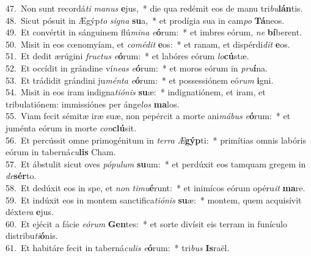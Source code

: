 {47.~}Non sunt recordá\textit{ti} \textit{ma}\textit{nus} \textbf{e}jus,~* die qua redémit eos de manu tri\textit{bu}\textbf{lán}tis.\\
{48.~}Sicut pósuit in Ægýp\textit{to} \textit{si}\textit{gna} \textbf{su}a,~* et prodígia sua in cam\textit{po} \textbf{Tá}neos.\\
{49.~}Et convértit in sánguinem flú\textit{mi}\textit{na} \textit{e}\textbf{ó}rum:~* et imbres eórum, \textit{ne} \textbf{bí}berent.\\
{50.~}Misit in eos cœnomyíam, et \textit{co}\textit{mé}\textit{dit} \textbf{e}os:~* et ranam, et dispérdi\textit{dit} \textbf{e}os.\\
{51.~}Et dedit ærúgini \textit{fru}\textit{ctus} \textit{e}\textbf{ó}rum:~* et labóres eórum \textit{lo}\textbf{cú}stæ.\\
{52.~}Et occídit in grándine ví\textit{ne}\textit{as} \textit{e}\textbf{ó}rum:~* et moros eórum in \textit{pru}\textbf{í}na.\\
{53.~}Et trádidit grándini ju\textit{mén}\textit{ta} \textit{e}\textbf{ó}rum:~* et possessiónem eó\textit{rum} \textbf{i}gni.\\
{54.~}Misit in eos iram indigna\textit{ti}\textit{ó}\textit{nis} \textbf{su}æ:~* indignatiónem, et iram, et tribulatiónem: immissiónes per ánge\textit{los} \textbf{ma}los.\\
{55.~}Viam fecit sémitæ iræ suæ, non pepércit a morte ani\textit{má}\textit{bus} \textit{e}\textbf{ó}rum:~* et juménta eórum in morte \textit{con}\textbf{clú}sit.\\
{56.~}Et percússit omne primogénitum in \textit{ter}\textit{ra} \textit{Æ}\textbf{gýp}ti:~* primítias omnis labóris eórum in taberná\textit{cu}\textbf{lis} Cham.\\
{57.~}Et ábstulit sicut oves \textit{pó}\textit{pu}\textit{lum} \textbf{su}um:~* et perdúxit eos tamquam gregem in \textit{de}\textbf{sér}to.\\
{58.~}Et dedúxit eos in spe, et \textit{non} \textit{ti}\textit{mu}\textbf{é}runt:~* et inimícos eórum opéru\textit{it} \textbf{ma}re.\\
{59.~}Et indúxit eos in montem sanctifica\textit{ti}\textit{ó}\textit{nis} \textbf{su}æ:~* montem, quem acquisívit déxte\textit{ra} \textbf{e}jus.\\
{60.~}Et ejécit a fácie \textit{e}\textit{ó}\textit{rum} \textbf{Gen}tes:~* et sorte divísit eis terram in funículo distribu\textit{ti}\textbf{ó}nis.\\
{61.~}Et habitáre fecit in taberná\textit{cu}\textit{lis} \textit{e}\textbf{ó}rum:~* tri\textit{bus} \textbf{Is}raël.\\
